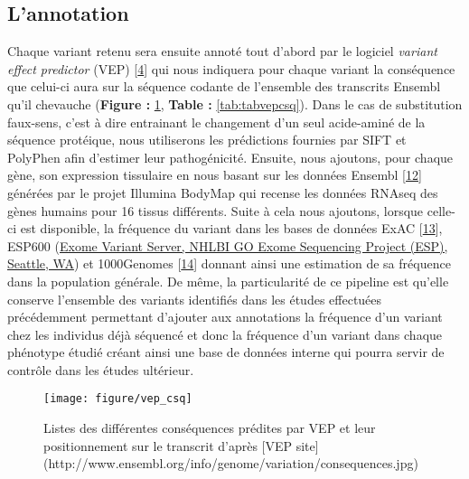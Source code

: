 \documentclass[12pt,twoside]{reedthesis}
\theoremstyle{definition}
\theoremstyle{definition}
\theoremstyle{remark}
\begin{document}
  \newpage
  
  \subsection{L'annotation}\label{lannotation}
  
  Chaque variant retenu sera ensuite annoté tout d'abord par le logiciel
  \emph{variant effect predictor} (VEP)
  {[}\protect\hyperlink{ref-McLaren2016}{4}{]} qui nous indiquera pour
  chaque variant la conséquence que celui-ci aura sur la séquence codante
  de l'ensemble des transcrits Ensembl qu'il chevauche (\textbf{Figure :
  }\ref{fig:figvepcsq}, \textbf{Table : }\ref{tab:tabvepcsq}). Dans le cas
  de substitution faux-sens, c'est à dire entrainant le changement d'un
  seul acide-aminé de la séquence protéique, nous utiliserons les
  prédictions fournies par SIFT et PolyPhen afin d'estimer leur
  pathogénicité. Ensuite, nous ajoutons, pour chaque gène, son expression
  tissulaire en nous basant sur les données Ensembl
  {[}\protect\hyperlink{ref-Aken2017}{12}{]} générées par le projet
  Illumina BodyMap qui recense les données RNAseq des gènes humains pour
  16 tissus différents. Suite à cela nous ajoutons, lorsque celle-ci est
  disponible, la fréquence du variant dans les bases de données ExAC
  {[}\protect\hyperlink{ref-Lek2016}{13}{]}, ESP600
  (\href{http://evs.gs.washington.edu/EVS/}{Exome Variant Server, NHLBI GO
  Exome Sequencing Project (ESP), Seattle, WA}) et 1000Genomes
  {[}\protect\hyperlink{ref-1000GenomesProjectConsortium2015}{14}{]}
  donnant ainsi une estimation de sa fréquence dans la population
  générale. De même, la particularité de ce pipeline est qu'elle conserve
  l'ensemble des variants identifiés dans les études effectuées
  précédemment permettant d'ajouter aux annotations la fréquence d'un
  variant chez les individus déjà séquencé et donc la fréquence d'un
  variant dans chaque phénotype étudié créant ainsi une base de données
  interne qui pourra servir de contrôle dans les études ultérieur.
  
  \begin{figure}
  
  {\centering \texttt{[image: figure/vep\_csq]} 
  
  }
  
  \caption[Listes des différentes conséquences prédites par VEP et leur positionnement sur le transcrit]{Listes des différentes conséquences prédites par VEP et leur positionnement sur le transcrit d'après [VEP site](http://www.ensembl.org/info/genome/variation/consequences.jpg)}\label{fig:figvepcsq}
  \end{figure}
  
\end{document}
